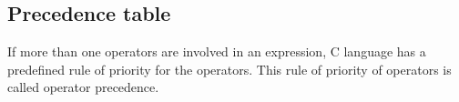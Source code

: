 \documentclass[a4paper]{article}
\begin{document}
\subsection{Precedence table}

If more than one operators are involved in an expression, C language has a predefined rule of priority for the operators. This rule of priority of operators is called operator precedence.


\end{document}
